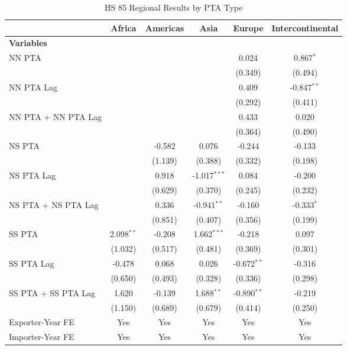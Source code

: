\begin{table}[htbp]
    \centering
    \caption{HS 85 Regional Results by PTA Type}
    \label{tab:85_pta_types}
    \begin{adjustbox}{max width=\textwidth}
    \begin{tabular}{lccccc}
    \hline
     & \multicolumn{1}{c}{Africa} & \multicolumn{1}{c}{Americas} & \multicolumn{1}{c}{Asia} & \multicolumn{1}{c}{Europe} & \multicolumn{1}{c}{Intercontinental} \\
    \hline
    \textbf{Variables} &  &  &  &  &  \\
    \hline
    NN PTA &  &  &  & 0.024 & 0.867$^{\ast}$ \\
     &  &  &  & (0.349) & (0.494) \\
    NN PTA Lag &  &  &  & 0.409 & -0.847$^{\ast\ast}$ \\
     &  &  &  & (0.292) & (0.411) \\
    NN PTA + NN PTA Lag &  &  &  & 0.433 & 0.020 \\
     &  &  &  & (0.364) & (0.490) \\
    \hline
    NS PTA &  & -0.582 & 0.076 & -0.244 & -0.133 \\
     &  & (1.139) & (0.388) & (0.332) & (0.198) \\
    NS PTA Lag &  & 0.918 & -1.017$^{\ast\ast\ast}$ & 0.084 & -0.200 \\
     &  & (0.629) & (0.370) & (0.245) & (0.232) \\
    NS PTA + NS PTA Lag &  & 0.336 & -0.941$^{\ast\ast}$ & -0.160 & -0.333$^{\ast}$ \\
     &  & (0.851) & (0.407) & (0.356) & (0.199) \\
    \hline
    SS PTA & 2.098$^{\ast\ast}$ & -0.208 & 1.662$^{\ast\ast\ast}$ & -0.218 & 0.097 \\
     & (1.032) & (0.517) & (0.481) & (0.369) & (0.301) \\
    SS PTA Lag & -0.478 & 0.068 & 0.026 & -0.672$^{\ast\ast}$ & -0.316 \\
     & (0.650) & (0.493) & (0.328) & (0.336) & (0.298) \\
    SS PTA + SS PTA Lag & 1.620 & -0.139 & 1.688$^{\ast\ast}$ & -0.890$^{\ast\ast}$ & -0.219 \\
     & (1.150) & (0.689) & (0.679) & (0.414) & (0.250) \\
    \hline
    Exporter-Year FE & Yes & Yes & Yes & Yes & Yes \\
    Importer-Year FE & Yes & Yes & Yes & Yes & Yes \\

\end{tabular}
\end{adjustbox}
\end{table}
